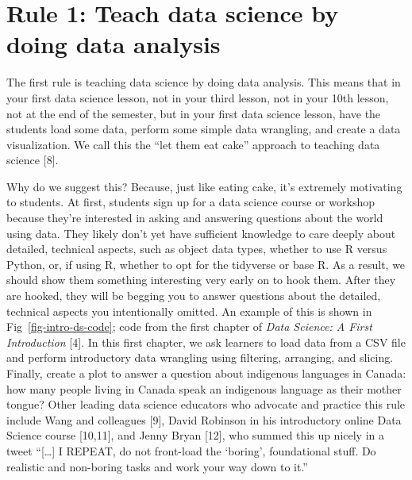 \documentclass[
  10pt,
  letterpaper,
]{article}
\begin{document}
\section{Rule 1: Teach data science by doing data
analysis}\label{sec-rule1}

The first rule is teaching data science by doing data analysis. This
means that in your first data science lesson, not in your third lesson,
not in your 10th lesson, not at the end of the semester, but in your
first data science lesson, have the students load some data, perform
some simple data wrangling, and create a data visualization. We call
this the ``let them eat cake'' approach to teaching data science
{[}8{]}.

Why do we suggest this? Because, just like eating cake, it's extremely
motivating to students. At first, students sign up for a data science
course or workshop because they're interested in asking and answering
questions about the world using data. They likely don't yet have
sufficient knowledge to care deeply about detailed, technical aspects,
such as object data types, whether to use R versus Python, or, if using
R, whether to opt for the tidyverse or base R. As a result, we should
show them something interesting very early on to hook them. After they
are hooked, they will be begging you to answer questions about the
detailed, technical aspects you intentionally omitted. An example of
this is shown in Fig~\ref{fig-intro-ds-code}; code from the first
chapter of \emph{Data Science: A First Introduction} {[}4{]}. In this
first chapter, we ask learners to load data from a CSV file and perform
introductory data wrangling using filtering, arranging, and slicing.
Finally, create a plot to answer a question about indigenous languages
in Canada: how many people living in Canada speak an indigenous language
as their mother tongue? Other leading data science educators who
advocate and practice this rule include Wang and colleagues {[}9{]},
David Robinson in his introductory online Data Science course
{[}10,11{]}, and Jenny Bryan {[}12{]}, who summed this up nicely in a
tweet ``{[}\ldots{]} I REPEAT, do not front-load the `boring',
foundational stuff. Do realistic and non-boring tasks and work your way
down to it.''
\end{document}
